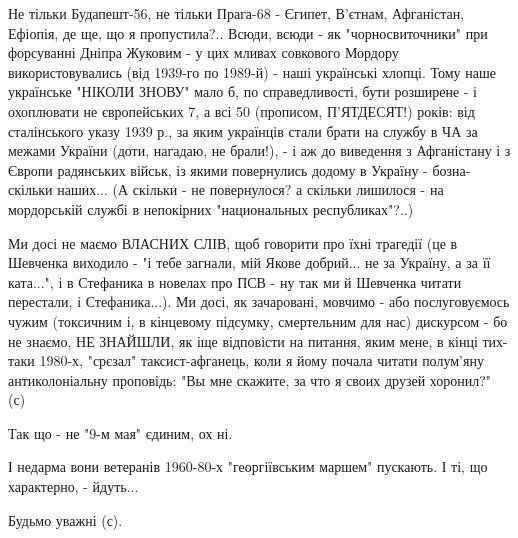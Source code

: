 Не тільки Будапешт-56, не тільки Прага-68 - Єгипет, В'єтнам, Афганістан,
Ефіопія, де ще, що я пропустила?.. Всюди, всюди - як "чорносвиточники" при
форсуванні Дніпра Жуковим - у цих мливах совкового Мордору використовувались
(від 1939-го по 1989-й)  - наші українські хлопці. Тому наше українське "НІКОЛИ
ЗНОВУ" мало б, по справедливості, бути розширене - і охоплювати не європейських
7, а всі 50 (прописом, П'ЯТДЕСЯТ!) років: від сталінського указу 1939 р., за
яким українців стали брати на службу в ЧА за межами України (доти, нагадаю, не
брали!), - і аж до виведення з Афганістану і з Європи радянських військ, із
якими повернулись додому в Україну - бозна-скільки наших... (А скільки - не
повернулося? а скільки лишилося - на мордорській службі в непокірних
"национальных республиках"?..)

Ми досі не маємо ВЛАСНИХ СЛІВ, щоб говорити про їхні трагедії (це в Шевченка
виходило - "і тебе загнали, мій Якове добрий... не за Україну, а за її
ката...", і в Стефаника в новелах про ПСВ - ну так ми й Шевченка читати
перестали, і Стефаника...). Ми досі, як зачаровані, мовчимо - або
послуговуємось чужим (токсичним і, в кінцевому підсумку, смертельним для нас)
дискурсом - бо не знаємо, НЕ ЗНАЙШЛИ, як іще відповісти на питання, яким мене,
в кінці тих-таки 1980-х, "срєзал" таксист-афганець, коли я йому почала читати
полум'яну антиколоніальну проповідь: "Вы мне скажите, за что я своих друзей
хоронил?" (с)

Так що - не "9-м мая" єдиним, ох ні. 

І недарма вони ветеранів 1960-80-х "георгіївським маршем" пускають. І ті, що характерно, - йдуть...

Будьмо уважні (с).

